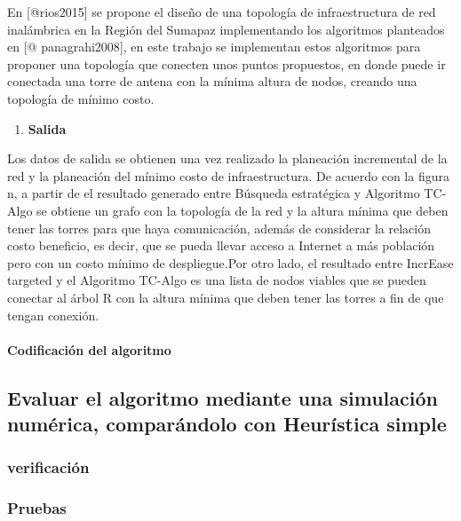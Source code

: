 \documentclass[]{article}
\providecommand{\tightlist}{%
  \setlength{\itemsep}{0pt}\setlength{\parskip}{0pt}}
\let\oldparagraph\paragraph
\renewcommand{\paragraph}[1]{\oldparagraph{#1}\mbox{}}
\begin{document}
En {[}@rios2015{]} se propone el diseño de una topología de
infraestructura de red inalámbrica en la Región del Sumapaz
implementando los algoritmos planteados en {[}@ panagrahi2008{]}, en
este trabajo se implementan estos algoritmos para proponer una topología
que conecten unos puntos propuestos, en donde puede ir conectada una
torre de antena con la mínima altura de nodos, creando una topología de
mínimo costo.

\begin{enumerate}
\def\labelenumi{\arabic{enumi}.}
\setcounter{enumi}{3}
\tightlist
\item
  \textbf{Salida}
\end{enumerate}

Los datos de salida se obtienen una vez realizado la planeación
incremental de la red y la planeación del mínimo costo de
infraestructura. De acuerdo con la figura n, a partir de el resultado
generado entre Búsqueda estratégica y Algoritmo TC-Algo se obtiene un
grafo con la topología de la red y la altura mínima que deben tener las
torres para que haya comunicación, además de considerar la relación
costo beneficio, es decir, que se pueda llevar acceso a Internet a más
población pero con un costo mínimo de despliegue.Por otro lado, el
resultado entre IncrEase targeted y el Algoritmo TC-Algo es una lista de
nodos viables que se pueden conectar al árbol R con la altura mínima que
deben tener las torres a fin de que tengan conexión.

\paragraph{Codificación del
algoritmo}\label{codificaciuxf3n-del-algoritmo}

\subsection{Evaluar el algoritmo mediante una simulación numérica,
comparándolo con Heurística
simple}\label{evaluar-el-algoritmo-mediante-una-simulaciuxf3n-numuxe9rica-comparuxe1ndolo-con-heuruxedstica-simple}

\subsubsection{verificación}\label{verificaciuxf3n}

\subsubsection{Pruebas}\label{pruebas}
\end{document}
